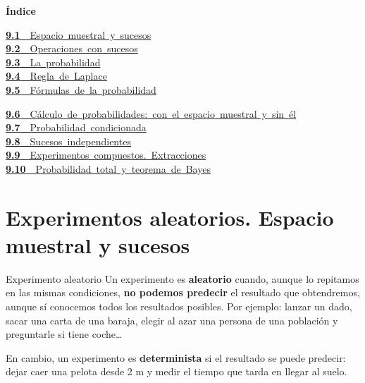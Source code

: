 \documentclass[11pt,a4paper]{article}
\begin{document}
\begin{tcolorbox}[colback=fmsurface,colframe=fmsurface,arc=3mm,left=4mm,right=4mm,top=2mm,bottom=2mm]
\small\textbf{Índice}\par\smallskip
\begin{minipage}[t]{0.40\linewidth}\small \mbox{\hyperlink{sec1}{\textbf{\color{fmgreen}9.1}\ \ Espacio muestral y sucesos}}\\[3pt]
\mbox{\hyperlink{sec2}{\textbf{\color{fmgreen}9.2}\ \ Operaciones con sucesos}}\\[3pt]
\mbox{\hyperlink{sec3}{\textbf{\color{fmgreen}9.3}\ \ La probabilidad}}\\[3pt]
\mbox{\hyperlink{sec4}{\textbf{\color{fmgreen}9.4}\ \ Regla de Laplace}}\\[3pt]
\mbox{\hyperlink{sec5}{\textbf{\color{fmgreen}9.5}\ \ Fórmulas de la probabilidad}}\\[3pt]\end{minipage}\hfill\begin{minipage}[t]{0.58\linewidth}\small \mbox{\hyperlink{sec6}{\textbf{\color{fmgreen}9.6}\ \ Cálculo de probabilidades: con el espacio muestral y sin él}}\\[3pt]
\mbox{\hyperlink{sec7}{\textbf{\color{fmgreen}9.7}\ \ Probabilidad condicionada}}\\[3pt]
\mbox{\hyperlink{sec8}{\textbf{\color{fmgreen}9.8}\ \ Sucesos independientes}}\\[3pt]
\mbox{\hyperlink{sec9}{\textbf{\color{fmgreen}9.9}\ \ Experimentos compuestos. Extracciones}}\\[3pt]
\mbox{\hyperlink{sec10}{\textbf{\color{fmgreen}9.10}\ \ Probabilidad total y teorema de Bayes}}\\[3pt]\end{minipage}
\end{tcolorbox}

\section{Experimentos aleatorios. Espacio muestral y sucesos}\hypertarget{sec1}{}

  

  
\begin{fmdef}{Experimento aleatorio}
Un experimento es \textbf{aleatorio} cuando, aunque lo repitamos en las mismas condiciones, \textbf{no podemos predecir} el resultado que obtendremos, aunque sí conocemos todos los resultados posibles. Por ejemplo: lanzar un dado, sacar una carta de una baraja, elegir al azar una persona de una población y preguntarle si tiene coche\dots{}

      

En cambio, un experimento es \textbf{determinista} si el resultado se puede predecir: dejar caer una pelota desde 2 m y medir el tiempo que tarda en llegar al suelo.
\end{fmdef}
\end{document}
